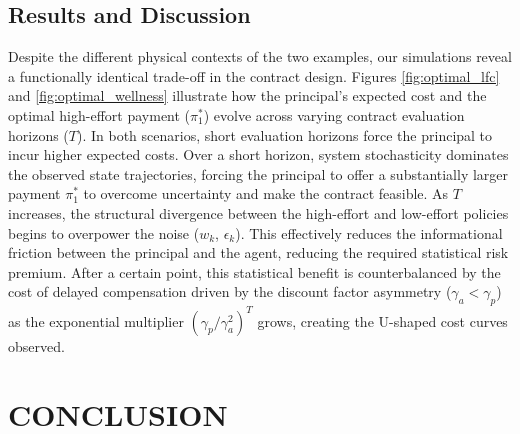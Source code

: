 \documentclass[letterpaper, 10 pt, conference]{ieeeconf}  %
\begin{document}
\subsection{Results and Discussion}
Despite the different physical contexts of the two examples, our simulations reveal a functionally identical trade-off in the contract design. Figures \ref{fig:optimal_lfc} and \ref{fig:optimal_wellness} illustrate how the principal's expected cost and the optimal high-effort payment ($\pi_1^*$) evolve across varying contract evaluation horizons ($T$). In both scenarios, short evaluation horizons force the principal to incur higher expected costs. Over a short horizon, system stochasticity dominates the observed state trajectories, forcing the principal to offer a substantially larger payment $\pi_1^*$ to overcome uncertainty and make the contract feasible. As $T$ increases, the structural divergence between the high-effort and low-effort policies begins to overpower the noise ($w_k$, $\epsilon_k$). This effectively reduces the informational friction between the principal and the agent, reducing the required statistical risk premium. After a certain point, this statistical benefit is counterbalanced by the cost of delayed compensation driven by the discount factor asymmetry ($\gamma_a < \gamma_p$) as the exponential multiplier $(\gamma_p / \gamma_a^2)^T$ grows, creating the  U-shaped cost curves observed.

\section{CONCLUSION}
\end{document}
